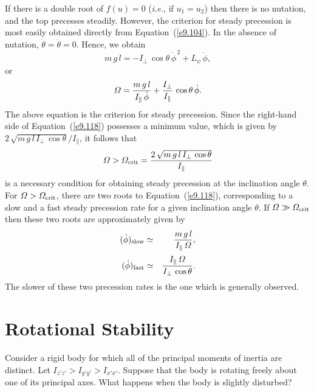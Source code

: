 If there is a double root of $f(u)=0$ ({\em i.e.}, if $u_1 = u_2$) then
there is no nutation, and the top precesses steadily.  However, the
criterion for steady precession is most easily obtained directly from
Equation~(\ref{e9.104}). In the absence of nutation, $\dot{\theta}=\ddot{\theta}=0$.
Hence, we obtain
\begin{equation}
m\,g\,l = -I_\perp\,\cos\theta\,\dot{\phi}^{\,2}+ L_\psi\,\dot{\phi},
\end{equation}
or 
\begin{equation}\label{e9.118}
{\mit\Omega}= \frac{m\,g\,l}{I_\parallel\,\dot{\phi}} + \frac{I_\perp}{I_\parallel}\,\cos\theta\,\dot{\phi}.
\end{equation}
The above equation is the criterion for steady precession. 
Since the right-hand side of Equation~(\ref{e9.118}) possesses a minimum
value, which is given by  $2\,\sqrt{m\,g\,l\,I_\perp\,\cos\theta}/I_\parallel$, it follows that
\begin{equation}
{\mit\Omega} >  {\mit\Omega}_{\rm crit} = \frac{2\,\sqrt{m\,g\,l\,I_\perp\,\cos\theta}}{I_\parallel}
\end{equation}
is a necessary condition for obtaining steady precession at the
inclination angle $\theta$. For ${\mit\Omega}>{\mit\Omega}_{\rm crit}$, there are two
roots to Equation~(\ref{e9.118}), corresponding to a slow and a fast steady
precession rate for a given inclination angle $\theta$. If ${\mit\Omega}\gg {\mit\Omega}_{\rm crit}$ then these two roots are approximately given by
\begin{eqnarray}
(\dot{\phi})_{\rm slow} &\simeq & \frac{m\,g\,l}{I_\parallel\,{\mit\Omega}},\\[0.5ex]
(\dot{\phi})_{\rm fast} &\simeq & \frac{I_\parallel\,{\mit\Omega}}{I_\perp\,\cos\theta}.
\end{eqnarray}
The slower of these two precession rates is the one which is
generally observed.

\section{Rotational Stability}
Consider a rigid body for which all of the principal moments of inertia
are distinct. Let $I_{z'z'} > I_{y'y'} > I_{x'x'}$. Suppose that the
body is rotating freely  about one of its principal axes. What happens when the
body is slightly disturbed? 


